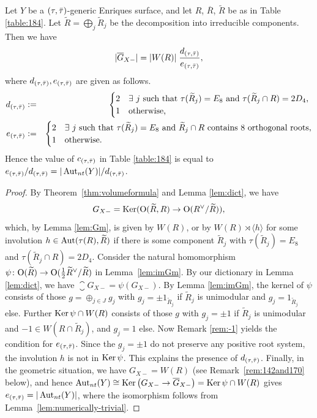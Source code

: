 \documentclass{amsart}
\numberwithin{procedure}{section}
\newcommand{\rl}{R}
\newcommand{\brl}{\overline{\rl}}
\newcommand{\trl}{\widetilde{\rl}}
\renewcommand{\ker}{\Ker}
\begin{document}
\begin{theorem}\label{thm:cde}
 Let $Y$ be a $(\tau, \bar{\tau})$-generic Enriques surface,
  and let $\rl$, $\brl$, $\trl$ be as in Table \ref{table:184}.
Let $\trl = \bigoplus_j \trl_j$ be the decomposition into irreducible components. 
 Then we have 
 \[
 |\overline{G}_{X-}|  = |W(R)|\;  \frac{d_{(\tau,\bar{\tau})}}{ e_{(\tau,\bar{\tau})}},
 \]
 where $d_{(\tau,\bar{\tau})}, e_{(\tau,\bar{\tau})}$ are given as follows.
\begin{eqnarray*}
 d_{(\tau,\taubar)}&:=&
 \begin{cases}
 2 & \text{$\exists$ $j$    such that
  $\tau(\trl_j) = E_8$ and $\tau(\trl_j\cap \rl) = 2D_4$, }\\
 1 & \text{otherwise,}
 \end{cases} 
 \\
  e_{(\tau,\taubar)}&:=&
  \begin{cases}
  2 & \text{$\exists$ $j$     such that    $\tau(\trl_j) = E_8$ and $\trl_j \cap \rl$ contains $8$ orthogonal roots,}\\
 1 & \text{otherwise.}
 \end{cases}
\end{eqnarray*}
 Hence the value of $c_{(\tau,\bar{\tau})}$  in Table \ref{table:184} is 
 equal to 
$e_{(\tau,\bar{\tau})}/  d_{(\tau,\bar{\tau})}=|\operatorname{\mathrm{Aut}}\nolimits_{nt}(Y)|/d_{(\tau,\bar{\tau})}$.
\end{theorem}
%
\begin{proof}
By Theorem~\ref{thm:volumeformula} and Lemma \ref{lem:dict}, we have
\[G_{X-}= %
\ker (\OG(\trl, \rl) \rightarrow \OG(\rl\dual / \trl)), 
\]
which, by Lemma \ref{lem:Gm}, is given
 by $W(\rl)$, or by $W(\rl)\rtimes \langle h \rangle$ for some involution $h \in \Aut(\tau(\rl),\trl)$ if there is some component $\trl_j$ with $\tau(\trl_j)=E_8$ and $\tau(\trl_j \cap \rl)=2D_4$.
Consider the natural homomorphism $\psi\colon \OG(\trl) \rightarrow \OG(\tfrac{1}{2}\trl\dual /\trl)$
in Lemma~\ref{lem:imGm}.
By our dictionary in Lemma \ref{lem:dict}, 
we have $\closure{G}_{X-} = \psi(G_{X-})$.
 By Lemma \ref{lem:imGm},
 the kernel 
 of 
 $\psi$ consists of those $g=\oplus_{j \in J} g_j$ with $g_j = \pm 1_{\trl_j}$ 
 if $\trl_j$ is unimodular and $g_j = 1_{\trl_j}$ else.
Further $\operatorname{\mathrm{Ker}}\nolimits \psi  \cap W(R)$ consists of those
$g$ with $g_j = \pm 1$ if $\trl_j$ is unimodular and $-1 \in W(R\cap \trl_j)$,  and $g_j=1$ else. 
Now Remark \ref{rem:-1} yields the condition for $e_{(\tau,\bar{\tau})}$.
Since the $g_j=\pm 1$ do not preserve any positive root system, 
the involution $h$ is not in $\operatorname{\mathrm{Ker}}\nolimits \psi $. 
This explains the presence of $d_{(\tau,\bar{\tau})}$.
Finally, in the geometric situation,
we have $G_{X-}=W(R)$
(see Remark~\ref{rem:142and170} below), 
 and hence $\Aut_{nt}(Y) \cong \ker\left( G_{X-} \to \Gbar_{X-}\right) = \Ker \psi \cap W(R)$ gives $e_{(\tau,\bar{\tau})}=|\operatorname{\mathrm{Aut}}\nolimits_{nt}(Y)|$,
 where the isomorphism 
follows from Lemma~\ref{lem:numerically-trivial}.
\end{proof}
\end{document}
